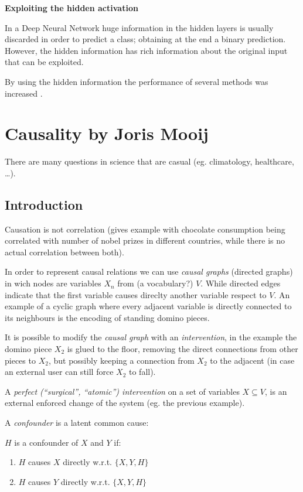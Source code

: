 \documentclass[b5paper]{report}
\begin{document}
\begin{mybox}
\textbf{Exploiting the hidden activation}

In a Deep Neural Network huge information in the hidden layers is usually
discarded in order to predict a class; obtaining at the end a binary
prediction. However, the hidden information has rich information about the
original input that can be exploited.
\end{mybox}

By using the hidden information the performance of several methods was
increased \cite{gu2016learning}.

\chapter{Causality by Joris Mooij}

There are many questions in science that are casual (eg. climatology,
healthcare, \dots).

\section{Introduction}


Causation is not correlation (gives example with chocolate consumption being
correlated with number of nobel prizes in different countries, while there is
no actual correlation between both).

In order to represent causal relations we can use \emph{causal graphs}
(directed graphs) in wich nodes are variables $X_n$ from (a vocabulary?) $V$.
While directed edges indicate that the first variable causes direclty another
variable respect to $V$. An example of a cyclic graph where every adjacent
variable is directly connected to its neighbours is the encoding of standing
domino pieces.

It is possible to modify the \emph{causal graph} with an \emph{intervention},
in the example the domino piece $X_2$ is glued to the floor, removing the
direct connections from other pieces to $X_2$, but possibly keeping a
connection from $X_2$ to the adjacent (in case an external user can still force
$X_2$ to fall).

A \emph{perfect (``surgical'', ``atomic'') intervention} on a set of variables
$X \subseteq V$, is an external enforced change of the system (eg. the
previous example).

A \emph{confounder} is a latent common cause:

\begin{mybox}
  $H$ is a confounder of $X$ and $Y$ if:
  \begin{enumerate}
    \item $H$ causes $X$ directly w.r.t. $\{X, Y, H\}$
    \item $H$ causes $Y$ directly w.r.t. $\{X, Y, H\}$
  \end{enumerate}
\end{mybox}
\end{document}
